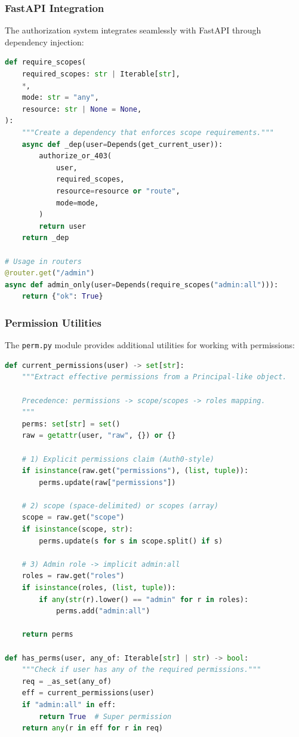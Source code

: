 \subsubsection{FastAPI Integration}

The authorization system integrates seamlessly with FastAPI through dependency injection:

\begin{lstlisting}[language=Python,caption={FastAPI authorization dependency}]
def require_scopes(
    required_scopes: str | Iterable[str],
    *,
    mode: str = "any",
    resource: str | None = None,
):
    """Create a dependency that enforces scope requirements."""
    async def _dep(user=Depends(get_current_user)):
        authorize_or_403(
            user,
            required_scopes,
            resource=resource or "route",
            mode=mode,
        )
        return user
    return _dep

# Usage in routers
@router.get("/admin")
async def admin_only(user=Depends(require_scopes("admin:all"))):
    return {"ok": True}
\end{lstlisting}

\subsubsection{Permission Utilities}

The \texttt{perm.py} module provides additional utilities for working with permissions:

\begin{lstlisting}[language=Python,caption={Permission extraction and checking}]
def current_permissions(user) -> set[str]:
    """Extract effective permissions from a Principal-like object.
    
    Precedence: permissions -> scope/scopes -> roles mapping.
    """
    perms: set[str] = set()
    raw = getattr(user, "raw", {}) or {}
    
    # 1) Explicit permissions claim (Auth0-style)
    if isinstance(raw.get("permissions"), (list, tuple)):
        perms.update(raw["permissions"])
    
    # 2) scope (space-delimited) or scopes (array)
    scope = raw.get("scope")
    if isinstance(scope, str):
        perms.update(s for s in scope.split() if s)
    
    # 3) Admin role -> implicit admin:all
    roles = raw.get("roles")
    if isinstance(roles, (list, tuple)):
        if any(str(r).lower() == "admin" for r in roles):
            perms.add("admin:all")
    
    return perms

def has_perms(user, any_of: Iterable[str] | str) -> bool:
    """Check if user has any of the required permissions."""
    req = _as_set(any_of)
    eff = current_permissions(user)
    if "admin:all" in eff:
        return True  # Super permission
    return any(r in eff for r in req)
\end{lstlisting}


